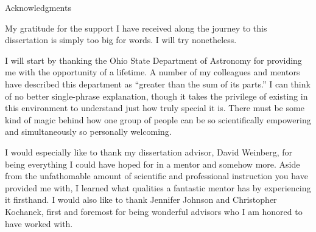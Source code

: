 \documentclass[main.tex]{subfiles}
\begin{document}
\vspace*{1cm}
\begin{center}
{\large Acknowledgments}
\end{center}

\begin{doublespace}

My gratitude for the support I have received along the journey to this
dissertation is simply too big for words.
I will try nonetheless.
\par
I will start by thanking the Ohio State Department of Astronomy for providing
me with the opportunity of a lifetime.
A number of my colleagues and mentors have described this department as
``greater than the sum of its parts.''
I can think of no better single-phrase explanation, though it takes the
privilege of existing in this environment to understand just how truly special
it is.
There must be some kind of magic behind how one group of people can be so
scientifically empowering and simultaneously so personally welcoming.
\par
I would especially like to thank my dissertation advisor, David Weinberg, for
being everything I could have hoped for in a mentor and somehow more.
Aside from the unfathomable amount of scientific and professional instruction
you have provided me with, I learned what qualities a fantastic mentor has by
experiencing it firsthand.
I would also like to thank Jennifer Johnson and Christopher Kochanek, first
and foremost for being wonderful advisors who I am honored to have worked with.
\par















\end{doublespace}
\end{document}
